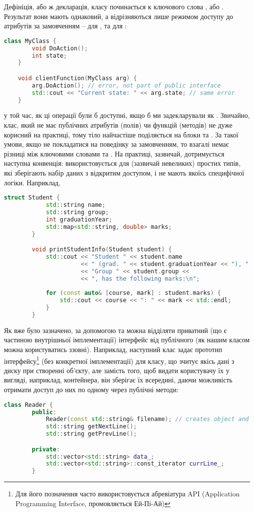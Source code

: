 \documentclass[12pt]{article}
\begin{document}
	Дефініція, або ж декларація, класу починається к ключового слова , або . Результат вони мають однаковий, а відрізняються лише режимом доступу до атрибутів за замовченням --  для , та  для :
	\begin{lstlisting}[language=c++]
	class MyClass {
		void DoAction();
		int state;
	}

	void clientFunction(MyClass arg) {
		arg.DoAction(); // error, not part of public interface
		std::cout << "Current state: " << arg.state; // same error
	}
	\end{lstlisting}
	у той час, як ці операції були б доступні, якщо б ми задекларували  як . Звичайно, клас, який не має публічних атрибутів (полів) чи функцій (методів) не дуже корисний на практиці, тому тіло найчастіше поділяється на блоки  та . За такої умови, якщо не покладатися на поведінку за замовченням, то взагалі немає різниці між ключовими словами  та . На практиці, зазвичай, дотримується наступна конвенція:  використовується для (зазвичай невеликих) простих типів, які зберігають набір даних з відкритим доступом, і не мають якоїсь специфічної логіки. Наприклад,
	\begin{lstlisting}[language=c++]
		struct Student {
			std::string name;
			std::string group;
			int graduationYear;
			std::map<std::string, double> marks;
		}

		void printStudentInfo(Student student) {
			std::cout << "Student " << student.name
					  << " (grad. " << student.graduationYear << "), "
					  << "Group " << student.group <<
					  << ", has the following marks:\n";
			
			for (const auto& [course, mark] : student.marks) {
				std::cout << course << ": " << mark << std::endl;
			}
		}
	\end{lstlisting}
	
	Як вже було зазначено, за допомогою  та  можна відділяти приватний (що є частиною внутрішньої імплементації) інтерфейс від публічного (як нашим класом можна користуватись ззовні). Наприклад, наступний клас задає прототип інтерфейсу\footnote{Для його позначення часто використовується абревіатура API (Application Programming Interface, промовляється Ей-Пі-Ай)} (без конкретної імплементації) для класу, що зчитує якісь дані з диску при створенні об'єкту, але замість того, щоб видати користувачу їх у вигляді, наприклад, контейнера, він зберігає їх всередині, даючи можливість отримати доступ до них по одному через публічні методи:
	\begin{lstlisting}[language=c++,label=readerh,caption="Reader.h"]
		class Reader {
		public:
			Reader(const std::string& filename); // creates object and loads data
			std::string getNextLine();
			std::string getPrevLine();

		private:
			std::vector<std::string> data_;
			std::vector<std::string>::const_iterator currLine_;
		}
	\end{lstlisting}
\end{document}
